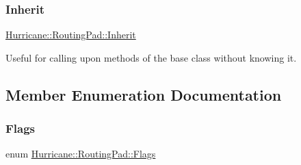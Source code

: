 \subsubsection{\texorpdfstring{Inherit}{Inherit}}
{\footnotesize\ttfamily \mbox{\hyperlink{classHurricane_1_1RoutingPad_a53bed3713fe846a351621d2022bc6b68}{Hurricane\+::\+Routing\+Pad\+::\+Inherit}}}

Useful for calling upon methods of the base class without knowing it. 

\subsection{Member Enumeration Documentation}
\mbox{\label{classHurricane_1_1RoutingPad_a69f37f0b06b9bfd758d9be42c71e2bd4}} 
\subsubsection{\texorpdfstring{Flags}{Flags}}
{\footnotesize\ttfamily enum \mbox{\hyperlink{classHurricane_1_1RoutingPad_a69f37f0b06b9bfd758d9be42c71e2bd4}{Hurricane\+::\+Routing\+Pad\+::\+Flags}}}

